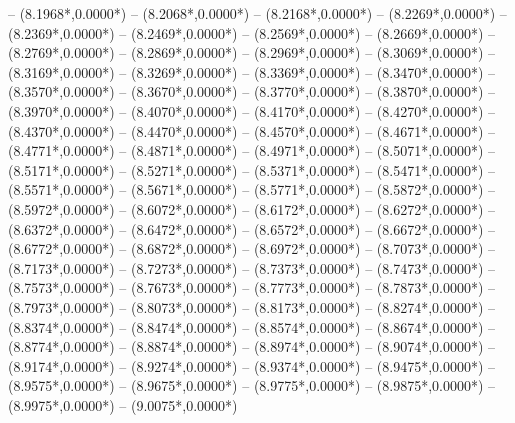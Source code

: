 {	-- ({8.1968*\dx},{0.0000*\dy})
	-- ({8.2068*\dx},{0.0000*\dy})
	-- ({8.2168*\dx},{0.0000*\dy})
	-- ({8.2269*\dx},{0.0000*\dy})
	-- ({8.2369*\dx},{0.0000*\dy})
	-- ({8.2469*\dx},{0.0000*\dy})
	-- ({8.2569*\dx},{0.0000*\dy})
	-- ({8.2669*\dx},{0.0000*\dy})
	-- ({8.2769*\dx},{0.0000*\dy})
	-- ({8.2869*\dx},{0.0000*\dy})
	-- ({8.2969*\dx},{0.0000*\dy})
	-- ({8.3069*\dx},{0.0000*\dy})
	-- ({8.3169*\dx},{0.0000*\dy})
	-- ({8.3269*\dx},{0.0000*\dy})
	-- ({8.3369*\dx},{0.0000*\dy})
	-- ({8.3470*\dx},{0.0000*\dy})
	-- ({8.3570*\dx},{0.0000*\dy})
	-- ({8.3670*\dx},{0.0000*\dy})
	-- ({8.3770*\dx},{0.0000*\dy})
	-- ({8.3870*\dx},{0.0000*\dy})
	-- ({8.3970*\dx},{0.0000*\dy})
	-- ({8.4070*\dx},{0.0000*\dy})
	-- ({8.4170*\dx},{0.0000*\dy})
	-- ({8.4270*\dx},{0.0000*\dy})
	-- ({8.4370*\dx},{0.0000*\dy})
	-- ({8.4470*\dx},{0.0000*\dy})
	-- ({8.4570*\dx},{0.0000*\dy})
	-- ({8.4671*\dx},{0.0000*\dy})
	-- ({8.4771*\dx},{0.0000*\dy})
	-- ({8.4871*\dx},{0.0000*\dy})
	-- ({8.4971*\dx},{0.0000*\dy})
	-- ({8.5071*\dx},{0.0000*\dy})
	-- ({8.5171*\dx},{0.0000*\dy})
	-- ({8.5271*\dx},{0.0000*\dy})
	-- ({8.5371*\dx},{0.0000*\dy})
	-- ({8.5471*\dx},{0.0000*\dy})
	-- ({8.5571*\dx},{0.0000*\dy})
	-- ({8.5671*\dx},{0.0000*\dy})
	-- ({8.5771*\dx},{0.0000*\dy})
	-- ({8.5872*\dx},{0.0000*\dy})
	-- ({8.5972*\dx},{0.0000*\dy})
	-- ({8.6072*\dx},{0.0000*\dy})
	-- ({8.6172*\dx},{0.0000*\dy})
	-- ({8.6272*\dx},{0.0000*\dy})
	-- ({8.6372*\dx},{0.0000*\dy})
	-- ({8.6472*\dx},{0.0000*\dy})
	-- ({8.6572*\dx},{0.0000*\dy})
	-- ({8.6672*\dx},{0.0000*\dy})
	-- ({8.6772*\dx},{0.0000*\dy})
	-- ({8.6872*\dx},{0.0000*\dy})
	-- ({8.6972*\dx},{0.0000*\dy})
	-- ({8.7073*\dx},{0.0000*\dy})
	-- ({8.7173*\dx},{0.0000*\dy})
	-- ({8.7273*\dx},{0.0000*\dy})
	-- ({8.7373*\dx},{0.0000*\dy})
	-- ({8.7473*\dx},{0.0000*\dy})
	-- ({8.7573*\dx},{0.0000*\dy})
	-- ({8.7673*\dx},{0.0000*\dy})
	-- ({8.7773*\dx},{0.0000*\dy})
	-- ({8.7873*\dx},{0.0000*\dy})
	-- ({8.7973*\dx},{0.0000*\dy})
	-- ({8.8073*\dx},{0.0000*\dy})
	-- ({8.8173*\dx},{0.0000*\dy})
	-- ({8.8274*\dx},{0.0000*\dy})
	-- ({8.8374*\dx},{0.0000*\dy})
	-- ({8.8474*\dx},{0.0000*\dy})
	-- ({8.8574*\dx},{0.0000*\dy})
	-- ({8.8674*\dx},{0.0000*\dy})
	-- ({8.8774*\dx},{0.0000*\dy})
	-- ({8.8874*\dx},{0.0000*\dy})
	-- ({8.8974*\dx},{0.0000*\dy})
	-- ({8.9074*\dx},{0.0000*\dy})
	-- ({8.9174*\dx},{0.0000*\dy})
	-- ({8.9274*\dx},{0.0000*\dy})
	-- ({8.9374*\dx},{0.0000*\dy})
	-- ({8.9475*\dx},{0.0000*\dy})
	-- ({8.9575*\dx},{0.0000*\dy})
	-- ({8.9675*\dx},{0.0000*\dy})
	-- ({8.9775*\dx},{0.0000*\dy})
	-- ({8.9875*\dx},{0.0000*\dy})
	-- ({8.9975*\dx},{0.0000*\dy})
	-- ({9.0075*\dx},{0.0000*\dy})
}
